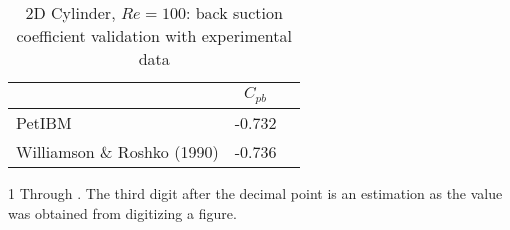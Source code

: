 \begin{table}[hbt!]
    \singlespacing
    \begin{threeparttable}[b]
        \begin{tabular}{lcc}
            \toprule
            & $C_{pb}$ \\
            \midrule
            PetIBM & -0.732   \\
            Williamson \& Roshko (1990) \tnote{1} & -0.736 \\
            \bottomrule
        \end{tabular}%
        \begin{tablenotes}
            \footnotesize
            \item [1] Through \cite{williamson_vortex_1996}. The third digit after the decimal point is an estimation as the value was obtained from digitizing a figure.
        \end{tablenotes}
        \caption[
            PetIBM, 2D Cylinder, $Re=100$: back suction coefficient validation with experimental data%
        ]{%
            2D Cylinder, $Re=100$: back suction coefficient validation with experimental data%
        }%
        \label{table:cylinder-2d-re100-cpb}
    \end{threeparttable}
\end{table}%